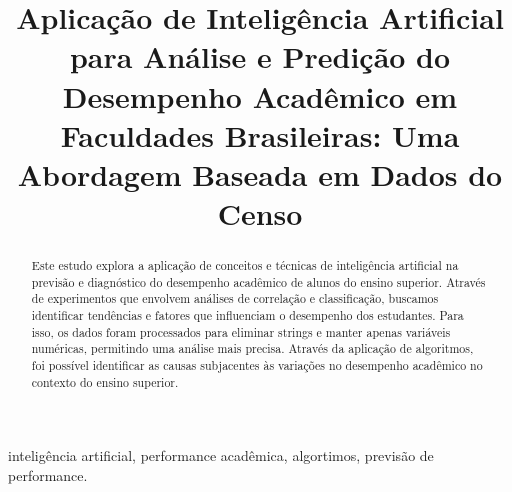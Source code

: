 \documentclass[conference]{IEEEtran}
\begin{document}
\title{Aplicação de Inteligência Artificial para Análise e Predição do Desempenho Acadêmico em Faculdades Brasileiras: Uma Abordagem Baseada em Dados do Censo
\\}

\author{
}

\maketitle

\begin{abstract}
Este estudo explora a aplicação de conceitos e técnicas de inteligência artificial na previsão e diagnóstico do desempenho acadêmico de alunos do ensino superior. Através de experimentos que envolvem análises de correlação e classificação, buscamos identificar tendências e fatores que influenciam o desempenho dos estudantes. Para isso, os dados foram processados para eliminar strings e manter apenas variáveis numéricas, permitindo uma análise mais precisa. Através da aplicação de algoritmos, foi possível identificar as causas subjacentes às variações no desempenho acadêmico no contexto do ensino superior.

\end{abstract}

\begin{IEEEkeywords}
inteligência artificial, performance acadêmica, algortimos, previsão de performance.
\end{IEEEkeywords}
\end{document}
